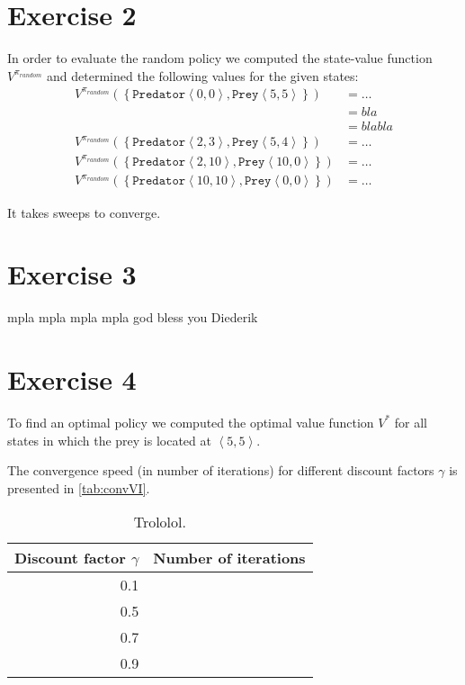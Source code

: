 \documentclass[a4paper,11pt]{article}
\newcommand{\Pred}[2]{\ensuremath{\mathtt{Predator}\left<#1, #2\right>}}
\newcommand{\Prey}[2]{\ensuremath{\mathtt{Prey}\left<#1, #2\right>}}
\begin{document}
\section*{Exercise 2}
In order to evaluate the random policy we computed the state-value function $V^{\pi_{random}}$ and determined the following values for the given states:\\

\begin{align*}
V^{\pi_{random}}(\left\{\Pred{0}{0},\Prey{5}{5}\right\}) & = \ldots \\
&= bla \\
&= blabla\\
    V^{\pi_{random}}(\left\{\Pred{2}{3},\Prey{5}{4}\right\}) &= \ldots \\
    V^{\pi_{random}}(\left\{\Pred{2}{10},\Prey{10}{0}\right\}) &= \ldots \\
    V^{\pi_{random}}(\left\{\Pred{10}{10},\Prey{0}{0}\right\}) &= \ldots
\end{align*}

It takes %
sweeps to converge.



\section*{Exercise 3}
mpla mpla mpla mpla god bless you Diederik

\section*{Exercise 4}
To find an optimal policy we computed the optimal value function $V^\ast$ for all states in which the prey is located at $\left<5,5\right>$.

The convergence speed (in number of iterations) for different discount factors $\gamma$ is presented in \autoref{tab:convVI}.
\begin{table}
\caption{Trololol.}
\label{tab:convVI}
\begin{center}
\begin{tabular}{|@{ }r@{ }|@{ }r@{ }|}
\hline
Discount factor $\gamma$ & Number of iterations \\
           \hline
0.1 & \\
0.5 & \\
0.7 & \\
0.9 & \\
\hline
\end{tabular}
\end{center}
\end{table}
\end{document}

